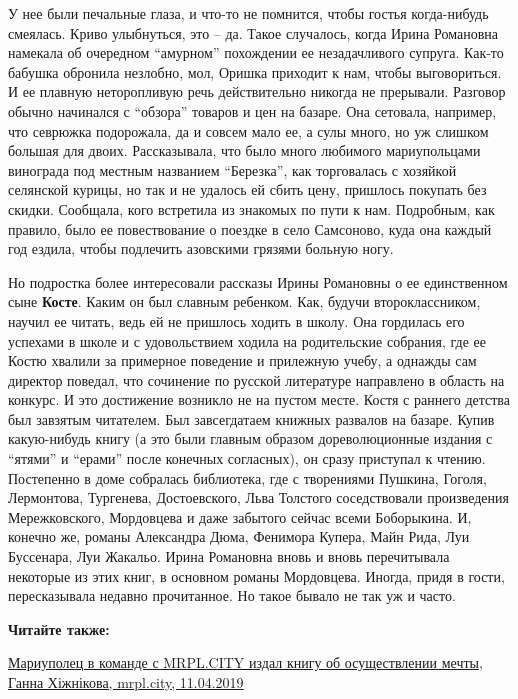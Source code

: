 У нее были печальные глаза, и что-то не помнится, чтобы гостья когда-нибудь
смеялась. Криво улыбнуться, это – да. Такое случалось, когда Ирина Романовна
намекала об очередном \enquote{амурном} похождении ее незадачливого супруга. Как-то
бабушка обронила незлобно, мол, Оришка приходит к нам, чтобы выговориться. И ее
плавную неторопливую речь действительно никогда не прерывали. Разговор обычно
начинался с \enquote{обзора} товаров и цен на базаре. Она сетовала, например, что
севрюжка подорожала, да и совсем мало ее, а сулы много, но уж слишком большая
для двоих. Рассказывала, что было много любимого мариупольцами винограда под
местным названием \enquote{Березка}, как торговалась с хозяйкой селянской курицы, но
так и не удалось ей сбить цену, пришлось покупать без скидки. Сообщала, кого
встретила из знакомых по пути к нам. Подробным, как правило, было ее
повествование о поездке в село Самсоново, куда она каждый год ездила, чтобы
подлечить азовскими грязями больную ногу.

Но подростка более интересовали рассказы Ирины Романовны о ее единственном сыне
\textbf{Косте}. Каким он был славным ребенком. Как, будучи второклассником, научил ее
читать, ведь ей не пришлось ходить в школу. Она гордилась его успехами в школе
и с удовольствием ходила на родительские собрания, где ее Костю хвалили за
примерное поведение и прилежную учебу, а однажды сам директор поведал, что
сочинение по русской литературе направлено в область на конкурс. И это
достижение возникло не на пустом месте. Костя с раннего детства был завзятым
читателем. Был завсегдатаем книжных развалов на базаре. Купив какую-нибудь
книгу (а это были главным образом дореволюционные издания с \enquote{ятями} и \enquote{ерами}
после конечных согласных), он сразу приступал к чтению. Постепенно в доме
собралась библиотека, где с творениями Пушкина, Гоголя, Лермонтова, Тургенева,
Достоевского, Льва Толстого соседствовали произведения Мережковского,
Мордовцева и даже забытого сейчас всеми Боборыкина. И, конечно же, романы
Александра Дюма, Фенимора Купера, Майн Рида, Луи Буссенара, Луи Жакальо. Ирина
Романовна вновь и вновь перечитывала некоторые из этих книг, в основном романы
Мордовцева. Иногда, придя в гости, пересказывала недавно прочитанное. Но такое
бывало не так уж и часто.

\textbf{Читайте также:} 

\href{https://mrpl.city/news/view/mariupolets-v-komande-s-mrplcity-izdal-knigu-ob-osushhestvlenii-mechty-foto}{%
Мариуполец в команде с MRPL.CITY издал книгу об осуществлении мечты, Ганна Хіжнікова, mrpl.city, 11.04.2019}

